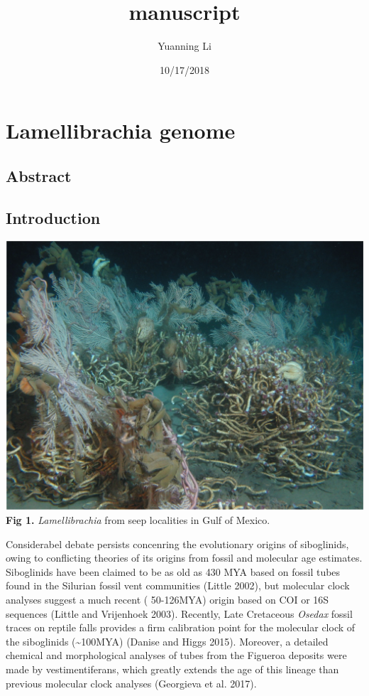 \documentclass[]{article}
\title{manuscript}
\author{Yuanning Li}
\date{10/17/2018}
\begin{document}
\maketitle

\hypertarget{lamellibrachia-genome}{%
\section{Lamellibrachia genome}\label{lamellibrachia-genome}}

\hypertarget{abstract}{%
\subsection{Abstract}\label{abstract}}

\hypertarget{introduction}{%
\subsection{Introduction}\label{introduction}}

\includegraphics{../figures/Picture1.png} \textbf{Fig 1.}
\emph{Lamellibrachia} from seep localities in Gulf of Mexico.

Considerabel debate persists concenring the evolutionary origins of
siboglinids, owing to conflicting theories of its origins from fossil
and molecular age estimates. Siboglinids have been claimed to be as old
as 430 MYA based on fossil tubes found in the Silurian fossil vent
communities (Little 2002), but molecular clock analyses suggest a much
recent ( 50-126MYA) origin based on COI or 16S sequences (Little and
Vrijenhoek 2003). Recently, Late Cretaceous \emph{Osedax} fossil traces
on reptile falls provides a firm calibration point for the molecular
clock of the siboglinids (\textasciitilde{}100MYA) (Danise and Higgs
2015). Moreover, a detailed chemical and morphological analyses of tubes
from the Figueroa deposits were made by vestimentiferans, which greatly
extends the age of this lineage than previous molecular clock analyses
(Georgieva et al. 2017).
\end{document}
